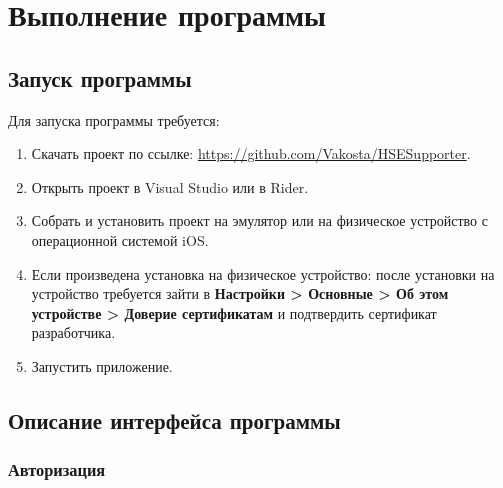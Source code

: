 \documentclass{../includes/TechDoc}
\begin{document}
    \section{Выполнение программы}

    \subsection{Запуск программы}

    Для запуска программы требуется:
    \begin{enumerate}
        \item Скачать проект по ссылке: \url{https://github.com/Vakosta/HSESupporter}.
        \item Открыть проект в Visual Studio или в Rider.
        \item Собрать и установить проект на эмулятор или на физическое устройство с операционной системой iOS.
        \item Если произведена установка на физическое устройство: после установки на устройство требуется зайти в
        \textbf{Настройки > Основные > Об этом устройстве > Доверие сертификатам} и подтвердить сертификат разработчика.
        \item Запустить приложение.
    \end{enumerate}

    \subsection{Описание интерфейса программы}

    \subsubsection{Авторизация}
\end{document}
